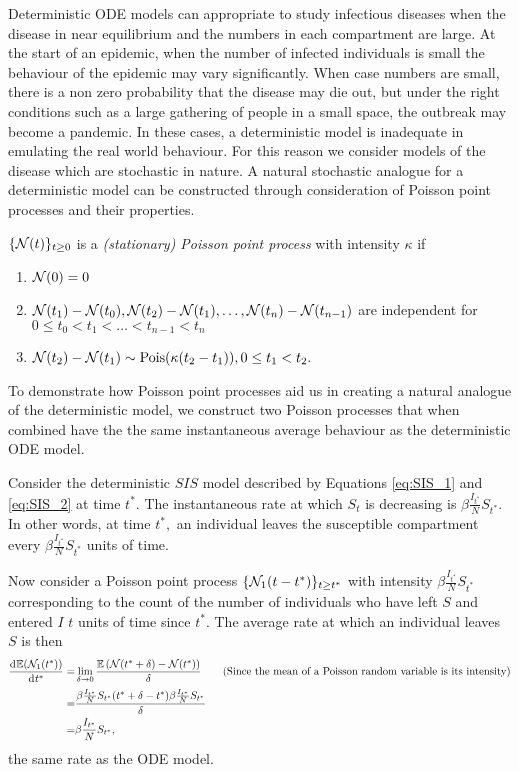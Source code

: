 Deterministic ODE models can appropriate to study infectious diseases
when the disease in near equilibrium and the numbers
in each compartment are large. At the start of an epidemic, when the
number of infected individuals is small the behaviour of the epidemic may
vary significantly. When case numbers are small, there is a non zero
probability that the disease may die out, but under the right conditions
such as a large gathering of people
in a small space, the outbreak may become a pandemic.
In these cases, a deterministic model is inadequate in emulating the real world
behaviour. For this reason we consider models of the disease which are
stochastic in nature. A natural stochastic analogue for a deterministic
model can be constructed through consideration of
Poisson point processes and their properties.

\begin{definition}\label{def:ppp}
    $\{\mathcal{N}(t)\}_{t\geq0}$ is a \emph{(stationary) Poisson point process} with intensity $\kappa$ if \begin{enumerate}
        \item $\mathcal{N}(0) = 0$
        \item $\mathcal{N}(t_1) - \mathcal{N}(t_0), \mathcal{N}(t_2) - \mathcal{N}(t_1), \dots, \mathcal{N}(t_n) - \mathcal{N}(t_{n-1})$ are independent for $0 \leq t_0 < t_1 < \dots < t_{n-1} < t_n $
        \item $\mathcal{N}(t_2) - \mathcal{N}(t_1) \sim \operatorname{Pois}(\kappa(t_2 - t_1)), 0 \leq t_1 < t_2.$
    \end{enumerate}
\end{definition}

To demonstrate how Poisson point processes aid us in creating a natural
analogue of the deterministic model, we construct two Poisson processes
that when combined have the
the same instantaneous average behaviour as the
deterministic ODE model.

Consider the deterministic $SIS$ model described by Equations
\ref{eq:SIS_1} and \ref{eq:SIS_2} at time $t^*.$ The
instantaneous rate at which $S_t$ is decreasing is
$\beta \frac{I_{t^*}}{N} S_{t^*}.$ In other words, at time $t^*,$
an individual leaves
the susceptible compartment every $\beta \frac{I_{t^*}}{N} S_{t^*}$
units of time.

Now consider a Poisson point process $\{\mathcal{N}_1(t - t^*)\}_{t\geq t^*}$ with
intensity $\beta \frac{I_{t^*}}{N} S_{t^*}$ corresponding to the count of the
number of individuals who have left $S$ and entered $I$ $t$ units of time
since $t^*.$ The average rate at which an individual leaves $S$ is then
\begin{align*}
    \frac{\diff \E(\N_1(t^*))}{\diff t^*}
    = & \lim_{\delta \to 0}\frac{\E{(\N(t^* + \delta) - \N(t^*))}}{\delta}
    \tag{Since the mean of a Poisson random variable is its intensity}     \\
    = & \frac{
        \beta \frac{I_{t^*}}{N} S_{t^*}
        (t^* + \delta - t^*)
        \beta \frac{I_{t^*}}{N} S_{t^*}
    }{
        \delta
    }                                                                      \\
    = & \beta \frac{I_{t^*}}{N} S_{t^*},
\end{align*}
the same rate as the ODE model.

